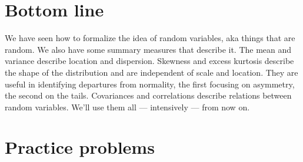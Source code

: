 \section*{Bottom line}

We have seen how to formalize the idea of random variables,
aka things that are random.
We also have some summary measures that describe it.
The mean and variance describe location and dispersion.
Skewness and excess kurtosis describe the shape of the distribution
and are independent of scale and location.
They are useful in identifying departures from normality,
the first focusing on asymmetry, the second on the tails.
Covariances and correlations describe
relations between random variables.
We'll use them all --- intensively --- from now on.


\section*{Practice problems}

